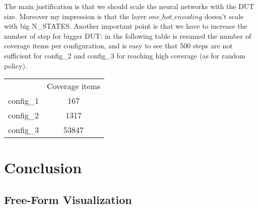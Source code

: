 \documentclass{article}
\begin{document}
The main justification is that we should scale the neural networks with the DUT size. Moreover my impression is that the layer $one\_hot\_encoding$ doesn't scale with big N\_STATES. Another important point is that we have to increase the number of step for bigger DUT: in the following table is resumed the number of coverage items per configuration, and is easy to see that 500 steps are not sufficient for config\_2 and config\_3 for reaching high coverage (as for random policy).

\begin{center}
  \begin{tabular}{ | c | c | }
    \hline
      & Coverage items \\
    config\_1 & 167 \\
    config\_2 & 1317 \\
    config\_3 & 53847 \\
    \hline
  \end{tabular}
\end{center}




% 


\section{ Conclusion}
% 

\subsection{Free-Form Visualization}
% 
% 
% 
\end{document}
